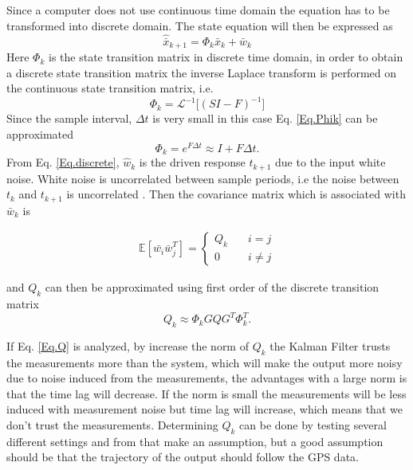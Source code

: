 Since a computer does not use continuous time domain the equation has to be transformed into discrete domain. The state equation will then be expressed as
\begin{equation}
\hat{\bar{x}}_{k+1} = \Phi_k \bar{x}_k +  \bar{w}_k	
\label{Eq.discrete}
\end{equation}
Here $\Phi_k$ is the state transition matrix in discrete time domain, in order to  obtain a discrete state transition matrix the inverse Laplace transform is performed on the continuous state transition matrix, i.e.
\begin{equation}
\Phi_k = \mathcal{L}^{-1}\big[(SI-F)^{-1}\big]
\label{Eq.Phik}
\end{equation}
Since the sample interval, $\Delta t$ is very small in this case Eq. \eqref{Eq.Phik} can be approximated 
\begin{equation}
\Phi_k = e^{F\Delta t} \approx I + F \Delta t 
\label{Eq.Final_Phik}.
\end{equation}
From Eq. \eqref{Eq.discrete}, $\hat{w}_k$ is the driven response $t_{k+1}$ due to the input white noise. White noise is uncorrelated between sample periods, i.e the noise between $t_k$ and $t_{k+1}$ is uncorrelated \cite{signal_process}. Then the covariance matrix which is associated with $\bar{w}_k$ is \cite{signal_process}

\begin{align}
\mathbb{E}[\bar{w_i}\bar{w}_j^T] =
\begin{cases}
  Q_k &\quad i=j\\    
  0 &\quad i\neq j   
\end{cases}
\end{align}

and $Q_k$ can then be approximated using first order of the discrete transition matrix \cite{Discrete_kalman}
\begin{equation}
Q_k\approx \Phi_k GQG^T \Phi_k^T.
\label{Eq.Q_k}
\end{equation}

If Eq. \eqref{Eq.Q} is analyzed, by increase the norm of $Q_k$ the Kalman Filter trusts the measurements more than the system, which will make the output more noisy due to noise induced from the measurements, the advantages with a large norm is that the time lag will decrease. If the norm is small the measurements will be less induced with measurement noise but time lag will increase, which means that we don't trust the measurements. Determining $Q_k$ can be done by testing several different settings and from that make an assumption, but a good assumption should be that the trajectory of the output should follow the GPS data.\\



